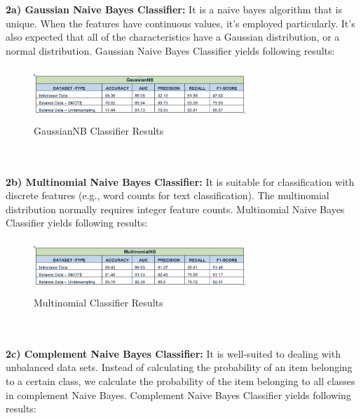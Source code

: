 \documentclass[a4paper, 10pt, conference]{ieeeconf}      %
\begin{document}
\\\
\\\textbf{2a) Gaussian Naive Bayes Classifier:} It is a naive bayes algorithm that is unique. When the features have continuous values, it's employed particularly. It's also expected that all of the characteristics have a Gaussian distribution, or a normal distribution.
Gaussian Naive Bayes Classifier yields following results:

\begin{figure}[htp]
    \centering
    \includegraphics[width=8cm,height=2cm]{Images/GaussianNB.png}
    \caption{GaussianNB Classifier Results}
    \label{fig:GaussianNB}
\end{figure}
\\\
\\\textbf{2b) Multinomial Naive Bayes Classifier:} It is suitable for classification with discrete features (e.g., word counts for text classification). The multinomial distribution normally requires integer feature counts. 
Multinomial Naive Bayes Classifier yields following results:

\begin{figure}[htp]
    \centering
    \includegraphics[width=8cm,height=2cm]{Images/MultinomialNB.png}
    \caption{Multinomial Classifier Results}
    \label{fig:MultinomialNB}
\end{figure}
\\\
\\\textbf{2c) Complement Naive Bayes Classifier:} It is well-suited to dealing with unbalanced data sets. Instead of calculating the probability of an item belonging to a certain class, we calculate the probability of the item belonging to all classes in complement Naive Bayes.
Complement Naive Bayes Classifier yields following results:
\end{document}
